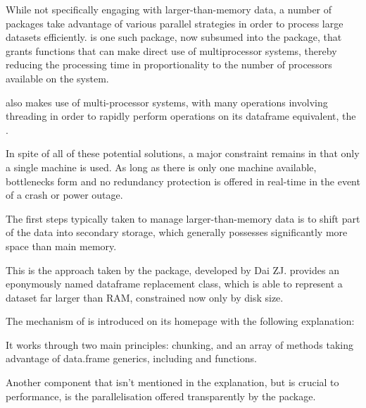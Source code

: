
While not specifically engaging with larger-than-memory data, a number of packages take advantage of various parallel strategies in order to process large datasets efficiently.
 is one such
package, now subsumed into the  package, that grants
functions that can make direct use of multiprocessor systems, thereby
reducing the processing time in proportionality to the number of
processors available on the system.

 also makes use of multi-processor systems, with many
operations involving threading in order to rapidly perform operations on
its dataframe equivalent, the .

In spite of all of these potential solutions, a major constraint remains in that only a single machine is used.
As long as there is only one machine available, bottlenecks form and no redundancy protection is offered in real-time in the event of a crash or power outage.

The first steps typically taken to manage larger-than-memory data is to shift part of the data into secondary storage, which generally possesses significantly more space than main memory.

This is the approach taken by the  package, developed by Dai ZJ.
 provides an eponymously named dataframe
replacement class, which is able to represent a dataset far larger than
RAM, constrained now only by disk size\cite{zj20}.

The mechanism of  is introduced on its homepage with the following explanation:


It works through two main principles: chunking, and an array of methods taking advantage of data.frame generics, including  and  functions.

Another component that isn't mentioned in the explanation, but is crucial to performance, is the parallelisation offered transparently by the package.

